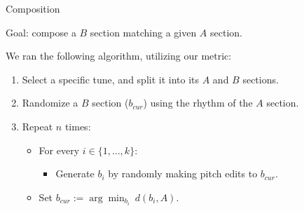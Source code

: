 \documentclass[letterpaper]{amsart}
\begin{document}
\begin{center}
\Huge
Composition
\end{center}
\huge
Goal: compose a $B$ section matching a given $A$ section.

We ran the following algorithm, utilizing our metric:
\begin{enumerate}[label={\arabic*.}]
\item Select a specific tune, and split it into its $A$ and $B$ sections.

\item Randomize a $B$ section ($b_{cur}$) using the rhythm of the $A$ section.

\item Repeat $n$ times:
\begin{itemize}\parskip=0.05in
\item[] For every $i \in \{1, \dots, k\}$:
\begin{itemize}
\item[] Generate $b_i$ by randomly making pitch edits to $b_{cur}$.
\end{itemize}
\item[] Set
$\displaystyle{b_{cur} := \arg \min_{b_i} \  d(b_i, A)}$.
\end{itemize}
\end{enumerate}


\end{document}
